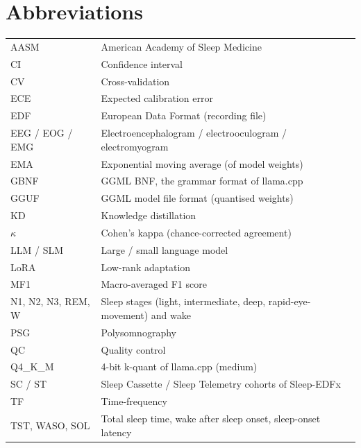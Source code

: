 \chapter*{Abbreviations}
\begin{tabular}{@{}ll@{}}
AASM & American Academy of Sleep Medicine \\
CI & Confidence interval \\
CV & Cross-validation \\
ECE & Expected calibration error \\
EDF & European Data Format (recording file) \\
EEG / EOG / EMG & Electroencephalogram / electrooculogram / electromyogram \\
EMA & Exponential moving average (of model weights) \\
GBNF & GGML BNF, the grammar format of llama.cpp \\
GGUF & GGML model file format (quantised weights) \\
KD & Knowledge distillation \\
$\kappa$ & Cohen's kappa (chance-corrected agreement) \\
LLM / SLM & Large / small language model \\
LoRA & Low-rank adaptation \\
MF1 & Macro-averaged F1 score \\
N1, N2, N3, REM, W & Sleep stages (light, intermediate, deep, rapid-eye-movement) and wake \\
PSG & Polysomnography \\
QC & Quality control \\
Q4\_K\_M & 4-bit k-quant of llama.cpp (medium) \\
SC / ST & Sleep Cassette / Sleep Telemetry cohorts of Sleep-EDFx \\
TF & Time-frequency \\
TST, WASO, SOL & Total sleep time, wake after sleep onset, sleep-onset latency \\
\end{tabular}
